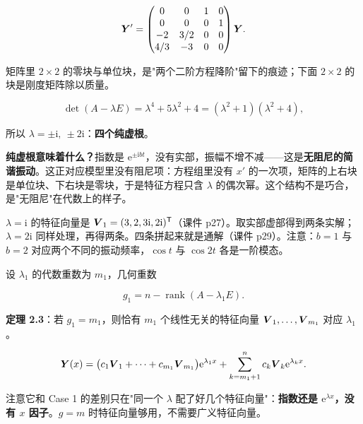 \documentclass[11pt]{ctexart}
\newcommand{\rank}{\operatorname{rank}}
\begin{document}
\[
\boldsymbol{Y}'=\begin{pmatrix}
0&0&1&0\\
0&0&0&1\\
-2&3/2&0&0\\
4/3&-3&0&0
\end{pmatrix}\boldsymbol{Y}.
\]

矩阵里 $2\times2$ 的零块与单位块，是"两个二阶方程降阶"留下的痕迹；下面 $2\times2$ 的块是刚度矩阵除以质量。



\[
\det(A-\lambda E)=\lambda^4+5\lambda^2+4=(\lambda^2+1)(\lambda^2+4),
\]

所以 $\lambda=\pm\mathrm{i},\ \pm2\mathrm{i}$：\textbf{四个纯虚根}。

\textbf{纯虚根意味着什么？}指数是 $\mathrm{e}^{\pm\mathrm{i}bt}$，没有实部，振幅不增不减——这是\textbf{无阻尼的简谐振动}。这正对应模型里没有阻尼项：方程组里没有 $x'$ 的一次项，矩阵的上右块是单位块、下右块是零块，于是特征方程只含 $\lambda$ 的偶次幂。这个结构不是巧合，是"无阻尼"在代数上的样子。


$\lambda=\mathrm{i}$ 的特征向量是 $\boldsymbol{V}_1=(3,2,3\mathrm{i},2\mathrm{i})^{\mathsf T}$（课件 p27）。取实部虚部得到两条实解；$\lambda=2\mathrm{i}$ 同样处理，再得两条。四条拼起来就是通解（课件 p29）。注意：$b=1$ 与 $b=2$ 对应两个不同的振动频率，$\cos t$ 与 $\cos2t$ 各是一阶模态。



设 $\lambda_1$ 的代数重数为 $m_1$，几何重数

\[
g_1=n-\rank(A-\lambda_1E).
\]

\textbf{定理 2.3}：若 $g_1=m_1$，则恰有 $m_1$ 个线性无关的特征向量 $\boldsymbol{V}_1,\dots,\boldsymbol{V}_{m_1}$ 对应 $\lambda_1$。


\[
\boldsymbol{Y}(x)=\bigl(c_1\boldsymbol{V}_1+\cdots+c_{m_1}\boldsymbol{V}_{m_1}\bigr)\mathrm{e}^{\lambda_1x}
+\sum_{k=m_1+1}^{n}c_k\boldsymbol{V}_k\mathrm{e}^{\lambda_kx}.
\]

注意它和 Case 1 的差别只在"同一个 $\lambda$ 配了好几个特征向量"：\textbf{指数还是 $\mathrm{e}^{\lambda x}$，没有 $x$ 因子}。$g=m$ 时特征向量够用，不需要广义特征向量。
\end{document}
